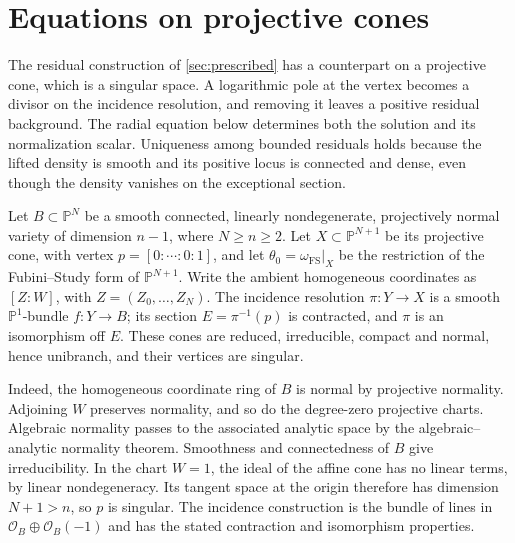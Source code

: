 \section{Equations on projective cones}
\label{sec:projective-cone-equations}

The residual construction of \cref{sec:prescribed} has a counterpart on a projective cone, which is a singular space. A logarithmic pole at the vertex becomes a divisor on the incidence resolution, and removing it leaves a positive residual background. The radial equation below determines both the solution and its normalization scalar. Uniqueness among bounded residuals holds because the lifted density is smooth and its positive locus is connected and dense, even though the density vanishes on the exceptional section.

Let $B\subset\mathbb P^N$ be a smooth connected, linearly nondegenerate, projectively normal variety of dimension $n-1$, where $N\geq n\geq2$. Let $X\subset\mathbb P^{N+1}$ be its projective cone, with vertex $p=[0:\cdots:0:1]$, and let $\theta_0=\omega_{\mathrm{FS}}|_X$ be the restriction of the Fubini--Study form of $\mathbb P^{N+1}$. Write the ambient homogeneous coordinates as $[Z:W]$, with $Z=(Z_0,\ldots,Z_N)$. The incidence resolution $\pi\colon Y\to X$ is a smooth $\mathbb P^1$-bundle $f\colon Y\to B$; its section $E=\pi^{-1}(p)$ is contracted, and $\pi$ is an isomorphism off $E$. These cones are reduced, irreducible, compact and normal, hence unibranch, and their vertices are singular.

Indeed, the homogeneous coordinate ring of $B$ is normal by projective normality. Adjoining $W$ preserves normality, and so do the degree-zero projective charts. Algebraic normality passes to the associated analytic space by the algebraic--analytic normality theorem. Smoothness and connectedness of $B$ give irreducibility. In the chart $W=1$, the ideal of the affine cone has no linear terms, by linear nondegeneracy. Its tangent space at the origin therefore has dimension $N+1>n$, so $p$ is singular. The incidence construction is the bundle of lines in $\mathcal O_B\oplus\mathcal O_B(-1)$ and has the stated contraction and isomorphism properties.

